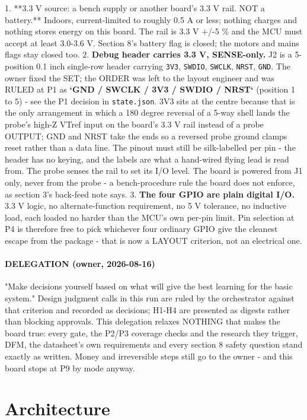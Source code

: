 \documentclass[11pt,a4paper]{article}
\begin{document}
1. {*}{*}3.3 V source: a bench supply or another board's 3.3 V rail. NOT a battery.{*}{*} Indoors, current-limited to roughly 0.5 A or less; nothing charges and nothing stores energy on this board. The rail is 3.3 V +/-5 \% and the MCU must accept at least 3.0-3.6 V. Section 8's battery flag is closed; the motors and mains flags stay closed too. 2. \textbf{Debug header carries 3.3 V, SENSE-only.} J2 is a 5-position 0.1 inch single-row header carrying \texttt{3V3}, \texttt{SWDIO}, \texttt{SWCLK}, \texttt{NRST}, \texttt{GND}. The owner fixed the SET; the ORDER was left to the layout engineer and was RULED at P1 as \textbf{`GND / SWCLK / 3V3 / SWDIO / NRST`} (position 1 to 5) - see the P1 decision in \texttt{state.json}. 3V3 sits at the centre because that is the only arrangement in which a 180 degree reversal of a 5-way shell lands the probe's high-Z VTref input on the board's 3.3 V rail instead of a probe OUTPUT; GND and NRST take the ends so a reversed probe ground clamps reset rather than a data line. The pinout must still be silk-labelled per pin - the header has no keying, and the labels are what a hand-wired flying lead is read from. The probe senses the rail to set its I/O level. The board is powered from J1 only, never from the probe - a bench-procedure rule the board does not enforce, as section 3's back-feed note says. 3. \textbf{The four GPIO are plain digital I/O.} 3.3 V logic, no alternate-function requirement, no 5 V tolerance, no inductive load, each loaded no harder than the MCU's own per-pin limit. Pin selection at P4 is therefore free to pick whichever four ordinary GPIO give the cleanest escape from the package - that is now a LAYOUT criterion, not an electrical one.

\paragraph*{DELEGATION (owner, 2026-08-16)}
"Make decisions yourself based on what will give the best learning for the basic system." Design judgment calls in this run are ruled by the orchestrator against that criterion and recorded as decisions; H1-H4 are presented as digests rather than blocking approvals. This delegation relaxes NOTHING that makes the board true: every gate, the P2/P3 coverage checks and the research they trigger, DFM, the datasheet's own requirements and every section 8 safety question stand exactly as written. Money and irreversible steps still go to the owner - and this board stops at P9 by mode anyway.

\section{Architecture}
\end{document}
